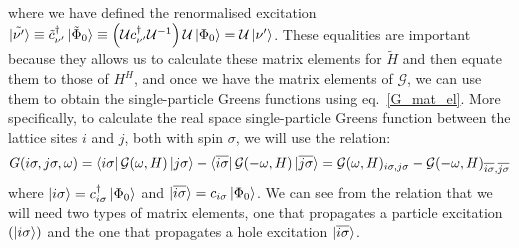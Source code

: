 \documentclass{report}
\numberwithin{equation}{section}
\begin{document}
where we have defined the renormalised excitation $\ket{\tilde {\nu^\prime}} \equiv \tilde c^\dagger_{\nu^\prime}\ket{\tilde \Phi_0} \equiv  \left(\mathcal{U} c^\dagger_{\nu^\prime}  \mathcal{U}^{-1}\right)  \mathcal{U}\ket{\Phi_0} =  \mathcal{U}\ket{{\nu^\prime}}$. These equalities are important because they allows us to calculate these matrix elements for $\tilde H$ and then equate them to those of $H^H$, and once we have the matrix elements of $\mathcal{G}$, we can use them to obtain the single-particle Greens functions using eq.~\ref{G_mat_el}. More specifically, to calculate the real space single-particle Greens function between the lattice sites $i$ and $j$, both with spin $\sigma$, we will use the relation:
\begin{equation}\begin{aligned}
	G(i\sigma, j\sigma, \omega) = \bra{ i\sigma} \mathcal{G}(\omega, H) \ket{ j\sigma} - \bra{\overline{i\sigma}} \mathcal{G}(-\omega, H) \ket{\overline {j\sigma}} = \mathcal{G}(\omega, H)_{ i\sigma, j\sigma} - \mathcal{G}(-\omega, H)_{\overline{i\sigma}, \overline {j\sigma}}
\end{aligned}\end{equation}
where $\ket{i\sigma}=c^\dagger_{i\sigma}\ket{\Phi_0}$ and $\ket{\overline{i\sigma}}=c_{i\sigma}\ket{\Phi_0}$. We can see from the relation that we will need two types of matrix elements, one that propagates a particle excitation $\left( \ket{i\sigma} \right) $ and the one that propagates a hole excitation $\ket{\overline{i\sigma}}$.
\end{document}

